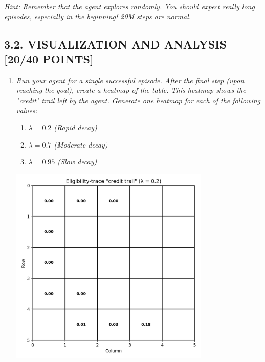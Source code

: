 \documentclass{article}
\begin{document}
\textit{Hint: Remember that the agent explores randomly. You should expect really long episodes, especially in the beginning! 20M steps are normal.}


\subsection{3.2. VISUALIZATION AND ANALYSIS [20/40 POINTS]}

\begin{enumerate}
    \item \textit{Run your agent for a single successful episode. After the final step (upon reaching the goal), create a heatmap of the table. This heatmap shows the "credit" trail left by the agent. Generate one heatmap for each of the following values:}
    \begin{enumerate}[label=\alph*.]
        \item \textit{$\lambda = 0.2$ (Rapid decay)}
        \item \textit{$\lambda = 0.7$ (Moderate decay)}
        \item \textit{$\lambda = 0.95$ (Slow decay)}
    \end{enumerate}
    
    \vspace{1em}
    \includegraphics[width=0.75\textwidth]{heatmap_lambda_0.2.png}
    

\end{enumerate}
\end{document}
